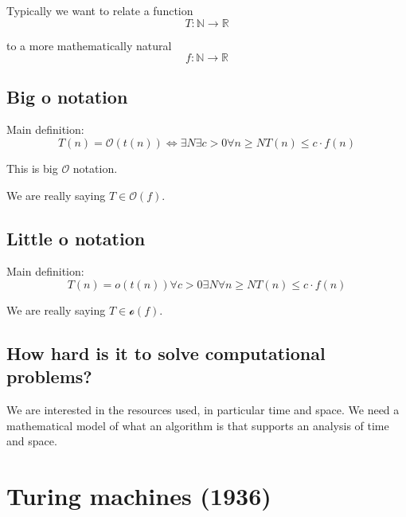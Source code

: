 \documentclass[a4paper,12pt]{article}
\theoremstyle{definition}
\theoremstyle{remark}
\newcommand{\N}{\mathbb{N}}
\newcommand{\R}{\mathbb{R}}
\begin{document}
Typically we want to relate a function
\begin{equation*}
    T: \N \to \R
\end{equation*}

to a more mathematically natural
\begin{equation*}
    f: \N \to \R
\end{equation*}

\subsection{Big o notation}
Main definition:
\begin{equation*}
    T(n) = \mathscr{O}(t(n)) \iff \exists N \exists c > 0 \forall n \geq N T(n) \leq c \cdot f(n)
\end{equation*}

This is big $\mathscr{O}$ notation.

We are really saying $T \in \mathscr{O}(f)$.


\subsection{Little o notation}
Main definition:
\begin{equation*}
    T(n) = o(t(n)) \forall c > 0 \exists N \forall n \geq N T(n) \leq c \cdot f(n)
\end{equation*}

We are really saying $T \in \mathscr{o}(f)$.






\newpage


\subsection*{How hard is it to solve computational problems?}

We are interested in the resources used, in particular time and space. We need a mathematical model of what an algorithm is that supports an analysis
of time and space.

\section{Turing machines (1936)}
\end{document}
